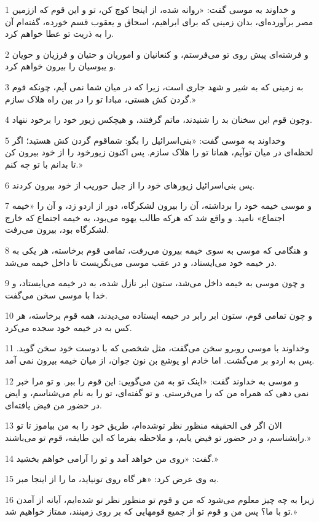 \par 1 و خداوند به موسی گفت: «روانه شده، از اینجا کوچ کن، تو و این قوم که اززمین مصر برآورده‌ای، بدان زمینی که برای ابراهیم، اسحاق و یعقوب قسم خورده، گفته‌ام آن را به ذریت تو عطا خواهم کرد.
\par 2 و فرشته‌ای پیش روی تو می‌فرستم، و کنعانیان و اموریان و حتیان و فرزیان و حویان و یبوسیان را بیرون خواهم کرد.
\par 3 به زمینی که به شیر و شهد جاری است، زیرا که در میان شما نمی آیم، چونکه قوم گردن کش هستی، مبادا تو را در بین راه هلاک سازم.»
\par 4 وچون قوم این سخنان بد را شنیدند، ماتم گرفتند، و هیچکس زیور خود را برخود ننهاد.
\par 5 وخداوند به موسی گفت: «بنی‌اسرائیل را بگو: شماقوم گردن کش هستید؛ اگر لحظه‌ای در میان توآیم، همانا تو را هلاک سازم. پس اکنون زیورخود را از خود بیرون کن تا بدانم با تو چه کنم.»
\par 6 پس بنی‌اسرائیل زیورهای خود را از جبل حوریب از خود بیرون کردند.
\par 7 و موسی خیمه خود را برداشته، آن را بیرون لشکرگاه، دور از اردو زد، و آن را «خیمه اجتماع» نامید. و واقع شد که هر‌که طالب یهوه می‌بود، به خیمه اجتماع که خارج لشکرگاه بود، بیرون می‌رفت.
\par 8 و هنگامی که موسی به سوی خیمه بیرون می‌رفت، تمامی قوم برخاسته، هر یکی به در خیمه خود می‌ایستاد، و در عقب موسی می‌نگریست تا داخل خیمه می‌شد.
\par 9 و چون موسی به خیمه داخل می‌شد، ستون ابر نازل شده، به در خیمه می‌ایستاد، و خدا با موسی سخن می‌گفت.
\par 10 و چون تمامی قوم، ستون ابر رابر در خیمه ایستاده می‌دیدند، همه قوم برخاسته، هر کس به در خیمه خود سجده می‌کرد.
\par 11 وخداوند با موسی روبرو سخن می‌گفت، مثل شخصی که با دوست خود سخن گوید. پس به اردو بر می‌گشت. اما خادم او یوشع بن نون جوان، از میان خیمه بیرون نمی آمد.
\par 12 و موسی به خداوند گفت: «اینک تو به من می‌گویی: این قوم را ببر. و تو مرا خبر نمی دهی که همراه من که را می‌فرستی. و تو گفته‌ای، تو را به نام می‌شناسم، و ایض در حضور من فیض یافته‌ای.
\par 13 الان اگر فی الحقیقه منظور نظر توشده‌ام، طریق خود را به من بیاموز تا تو رابشناسم، و در حضور تو فیض یابم، و ملاحظه بفرما که این طایفه، قوم تو می‌باشند.»
\par 14 گفت: «روی من خواهد آمد و تو را آرامی خواهم بخشید.»
\par 15 به وی عرض کرد: «هر گاه روی تونیاید، ما را از اینجا مبر. 
\par 16 زیرا به چه چیز معلوم می‌شود که من و قوم تو منظور نظر تو شده‌ایم، آیانه از آمدن تو با ما؟ پس من و قوم تو از جمیع قومهایی که بر روی زمینند، ممتاز خواهیم شد.»
